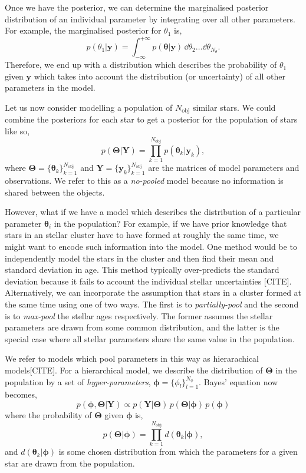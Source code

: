 Once we have the posterior, we can determine the marginalised posterior distribution of an individual parameter by integrating over all other parameters. For example, the marginalised posterior for $\theta_1$ is,
%
\begin{equation}
    p(\theta_1 | \bm{y}) = \int_{-\infty}^{+\infty} p(\bm{\theta} | \bm{y}) \, \dd \theta_2 \dots \dd \theta_{N_{\theta}}.
\end{equation}
%
Therefore, we end up with a distribution which describes the probability of $\theta_1$ given $\bm{y}$ which takes into account the distribution (or uncertainty) of all other parameters in the model.

Let us now consider modelling a population of $N_\mathrm{obj}$ similar stars. We could combine the posteriors for each star to get a posterior for the population of stars like so,
%
\begin{equation}
    p(\bm{\Theta}|\bm{Y}) = \prod_{k=1}^{N_\mathrm{obj}} p(\bm{\theta}_k|\bm{y}_k),
\end{equation}
%
where $\bm{\Theta} = \{\bm{\theta}_k\}_{k=1}^{N_\mathrm{obj}}$ and $\bm{Y} = \{\bm{y}_k\}_{k=1}^{N_\mathrm{obj}}$ are the matrices of model parameters and observations. We refer to this as a \emph{no-pooled} model because no information is shared between the objects. 

However, what if we have a model which describes the distribution of a particular parameter $\bm{\theta}_i$ in the population? For example, if we have prior knowledge that stars in an stellar cluster have to have formed at roughly the same time, we might want to encode such information into the model. One method would be to independently model the stars in the cluster and then find their mean and standard deviation in age. This method typically over-predicts the standard deviation because it fails to account the individual stellar uncertainties [CITE]. Alternatively, we can incorporate the assumption that stars in a cluster formed at the same time using one of two ways. The first is to \emph{partially-pool} and the second is to \emph{max-pool} the stellar ages respectively. The former assumes the stellar parameters are drawn from some common distribution, and the latter is the special case where all stellar parameters share the same value in the population.

We refer to models which pool parameters in this way as hierarachical models[CITE]. For a hierarchical model, we describe the distribution of $\bm{\Theta}$ in the population by a set of \emph{hyper-parameters}, $\bm{\phi} = \{ \phi_l \}_{l=1}^{N_\phi}$. Bayes' equation now becomes,
%
\begin{equation}
    p(\bm{\phi}, \bm{\Theta} | \bm{Y}) \propto p(\bm{Y} | \bm{\Theta}) \, p(\bm{\Theta} | \bm{\phi}) \, p(\bm{\phi})
\end{equation}
%
where the probability of $\bm{\Theta}$ given $\bm{\phi}$ is,
%
\begin{equation}
    p(\bm{\Theta} | \bm{\phi}) = \prod_{k=1}^{N_\mathrm{obj}} d(\bm{\theta}_k | \bm{\phi}),
\end{equation}
%
and $d(\bm{\theta}_k | \bm{\phi})$ is some chosen distribution from which the parameters for a given star are drawn from the population.

